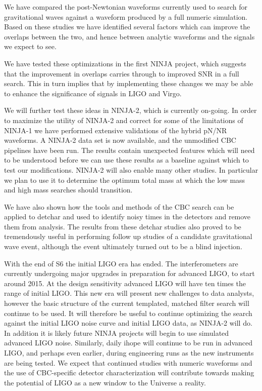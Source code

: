 We have compared the post-Newtonian waveforms currently used to
search for gravitational waves against a waveform produced by 
a full numeric simulation.  Based on these studies we have identified
several factors which can improve the overlaps between the two, and
hence between analytic waveforms and the signals we expect to see.

We have tested these optimizations in the first NINJA project, which
suggests that the improvement in overlaps carries through to improved
SNR in a full search.  This in turn implies that by implementing these
changes we may be able to enhance the significance of signals in LIGO
and Virgo.

We will further test these ideas in NINJA-2, which is currently
on-going.  In order to maximize the utility of NINJA-2 and correct
for some of the limitations of NINJA-1 we have performed extensive
validations of the hybrid pN/NR waveforms.  A NINJA-2 data set is now
available, and the unmodified CBC pipelines have been run.  The
results contain unexpected features which will need to be understood
before we can use these results as a baseline against which to test
our modifications.  NINJA-2 will also enable many other studies.  In
particular we plan to use it to determine the optimum total mass at
which the low mass and high mass searches should transition.

We have also shown how the tools and methods of the CBC search can be
applied to detchar and used to identify noisy times in the detectors
and remove them from analysis.  The results from these detchar studies
also proved to be tremendously useful in performing follow up studies
of a candidate gravitational wave event, although the event ultimately
turned out to be a blind injection.

With the end of S6 the initial LIGO era has ended.  The
interferometers are currently undergoing major upgrades in preparation
for advanced LIGO, to start around 2015.  At the design sensitivity
advanced LIGO will have ten times the range of initial LIGO.  This new
era will present new challenges to data analysts, however the basic
structure of the current templated, matched filter search will
continue to be used.   It will therefore be useful to continue
optimizing the search against the initial LIGO noise curve and initial
LIGO data, as NINJA-2 will do.  In addition it is likely future NINJA
projects will begin to use simulated advanced LIGO noise.  Similarly,
daily ihope will continue to be run in advanced LIGO, and perhaps even
earlier, during engineering runs as the new instruments are being
tested.  We expect that continued studies with numeric waveforms and
the use of CBC-specific detector characterization will contribute
towards making the potential of LIGO as a new window to the Universe a
reality.


